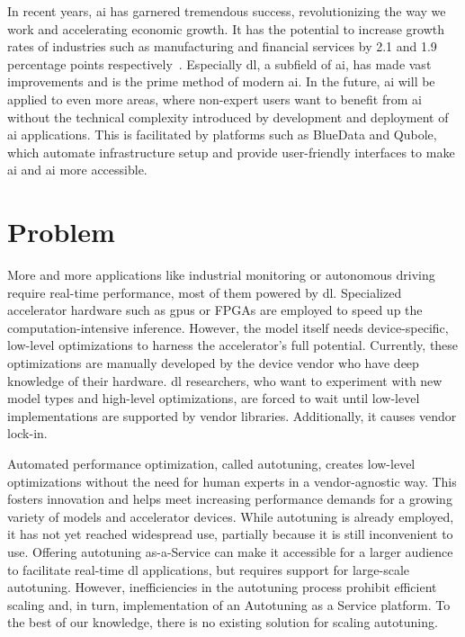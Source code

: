 In recent years, \gls{ai} has garnered tremendous success, revolutionizing the way we work and accelerating economic growth. It has the potential to increase growth rates of industries such as manufacturing and financial services by 2.1 and 1.9 percentage points respectively~\cite[p.~17]{Statista.2019}. Especially \gls{dl}, a subfield of \gls{ai}, has made vast improvements and is the prime method of modern \gls{ai}. In the future, \gls{ai} will be applied to even more areas, where non-expert users want to benefit from \gls{ai} without the technical complexity introduced by development and deployment of \gls{ai} applications. This is facilitated by platforms such as BlueData and Qubole, which automate infrastructure setup and provide user-friendly interfaces to make \gls{ai} and \gls{ai} more accessible. 

\section{Problem}
More and more applications like industrial monitoring or autonomous driving require real-time performance, most of them powered by \gls{dl}. Specialized accelerator hardware such as \glspl{gpu} or FPGAs are employed to speed up the computation-intensive inference. However, the model itself needs device-specific, low-level optimizations to harness the accelerator's full potential. Currently, these optimizations are manually developed by the device vendor who have deep knowledge of their hardware. \gls{dl} researchers, who want to experiment with new model types and high-level optimizations, are forced to wait until low-level implementations are supported by vendor libraries. Additionally, it causes vendor lock-in.

Automated performance optimization, called autotuning, creates low-level optimizations without the need for human experts in a vendor-agnostic way. This fosters innovation and helps meet increasing performance demands for a growing variety of models and accelerator devices. While autotuning is already employed, it has not yet reached widespread use, partially because it is still inconvenient to use. Offering autotuning as-a-Service can make it accessible for a larger audience to facilitate real-time \gls{dl} applications, but requires support for large-scale autotuning. However, inefficiencies in the autotuning process prohibit efficient scaling and, in turn, implementation of an Autotuning as a Service platform. To the best of our knowledge, there is no existing solution for scaling autotuning.

